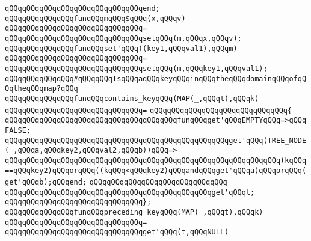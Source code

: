 \verb|qQQqqQQqqQQqqQQqqQQqqQQqqQQqqQQqend;|\newline
\newline
\verb|qQQqqQQqqQQqqQQqfunqQQqmqQQq$qQQq(x,qQQqv)|\newline
\verb|qQQqqQQqqQQqqQQqqQQqqQQqqQQqqQQq=|\newline
\verb|qQQqqQQqqQQqqQQqqQQqqQQqqQQqqQQqsetqQQq(m,qQQqx,qQQqv);|\newline
\newline
\verb|qQQqqQQqqQQqqQQqfunqQQqset'qQQq((key1,qQQqval1),qQQqm)|\newline
\verb|qQQqqQQqqQQqqQQqqQQqqQQqqQQqqQQq=|\newline
\verb|qQQqqQQqqQQqqQQqqQQqqQQqqQQqqQQqsetqQQq(m,qQQqkey1,qQQqval1);|\newline
\newline
\newline
\newline
\verb|qQQqqQQqqQQqqQQq#qQQqqQQqIsqQQqaqQQqkeyqQQqinqQQqtheqQQqdomainqQQqofqQQqtheqQQqmap?qQQq|\newline
\newline
\verb|qQQqqQQqqQQqqQQqfunqQQqcontains_keyqQQq(MAP(_,qQQqt),qQQqk)|\newline
\verb|qQQqqQQqqQQqqQQqqQQqqQQqqQQqqQQq=|\newline
\verb|qQQqqQQqqQQqqQQqqQQqqQQqqQQqqQQq{|\newline
\verb|qQQqqQQqqQQqqQQqqQQqqQQqqQQqqQQqqQQqqQQqfunqQQqget'qQQqEMPTYqQQq=>qQQqFALSE;|\newline
\verb|qQQqqQQqqQQqqQQqqQQqqQQqqQQqqQQqqQQqqQQqqQQqqQQqqQQqget'qQQq(TREE_NODE(_,qQQqa,qQQqkey2,qQQqval2,qQQqb))qQQq=>|\newline
\verb|qQQqqQQqqQQqqQQqqQQqqQQqqQQqqQQqqQQqqQQqqQQqqQQqqQQqqQQqqQQqqQQq(kqQQq==qQQqkey2)qQQqorqQQq((kqQQq<qQQqkey2)qQQqandqQQqget'qQQqa)qQQqorqQQq(get'qQQqb);qQQqend;|\newline
\verb|qQQqqQQqqQQqqQQqqQQqqQQqqQQqqQQq|\newline
\verb|qQQqqQQqqQQqqQQqqQQqqQQqqQQqqQQqqQQqqQQqqQQqqQQqget'qQQqt;|\newline
\verb|qQQqqQQqqQQqqQQqqQQqqQQqqQQqqQQq};|\newline
\newline
\verb|qQQqqQQqqQQqqQQqfunqQQqpreceding_keyqQQq(MAP(_,qQQqt),qQQqk)|\newline
\verb|qQQqqQQqqQQqqQQqqQQqqQQqqQQqqQQq=|\newline
\verb|qQQqqQQqqQQqqQQqqQQqqQQqqQQqqQQqget'qQQq(t,qQQqNULL)|\newline
